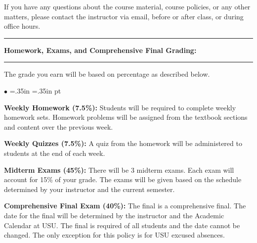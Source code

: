 \documentclass[10pt,fleqn]{article}
\begin{document}
\vskip0.1in

\noindent
If you have any questions about the course material, course policies, or any
other matters, please contact the instructor via email, before or after class,
or during office hours.
\vskip0.1in\hrule\vskip0.1in
\noindent
{\bf Homework, Exams, and Comprehensive Final Grading:}
\vskip0.1in\hrule\vskip0.1in
\noindent
The grade you earn will be based on percentage as described below.

\vskip0.1in

\noindent
\begin{list}{$\bullet$}{ \parsep=0pt \listparindent=0pt
\topsep=0pt \rightmargin=.35in \leftmargin=.35in   pt \itemsep=2pt}
  \item {\bf Weekly Homework (7.5\%):} Students will be required to complete 
        weekly homework sets. Homework problems will be assigned from the
        textbook sections and content over the previous week.
  \item {\bf Weekly Quizzes (7.5\%):} A quiz from the homework will be
        administered to students at the end of each week. 
  \item {\bf Midterm Exams (45\%):} There will be 3 midterm exams. Each exam
        will account for 15\% of your grade. The exams will be given based on
        the schedule determined by your instructor and the current semester.
  \item {\bf Comprehensive Final Exam (40\%):} The final is a comprehensive
        final. The date for the final will be determined by the instructor and
        the Academic Calendar at USU. The final is required of all students and
        the date cannot be changed. The only exception for this policy is for
        USU excused absences.
\end{list}

\vskip0.1in
\end{document}
